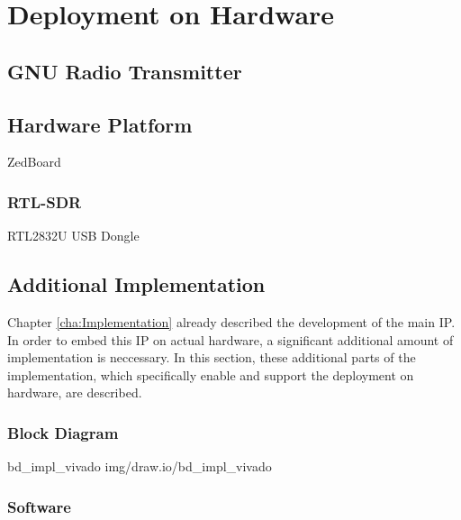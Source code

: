 \chapter{Deployment on Hardware}
\label{cha:DeploymentOnHardware}

\section{GNU Radio Transmitter}


\section{Hardware Platform}
ZedBoard


\subsection{RTL-SDR}
RTL2832U USB Dongle

\section{Additional Implementation}

Chapter \ref{cha:Implementation} already described the development of the main IP.
In order to embed this IP on actual hardware, a significant additional amount of implementation is neccessary.
In this section, these additional parts of the implementation, which specifically enable and support the deployment on hardware, are described.

\subsection{Block Diagram}

 {bd_impl_vivado} {img/draw.io/bd_impl_vivado}

\subsection{Software}


